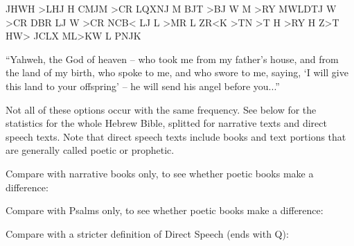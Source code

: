 \documentclass{report}
\newcommand{\cl}[2]{\begingroup\beginL\begingroup\color{#1}\beginR#2\endR\endgroup\endL\endgroup}
\begin{document}
\begin{itemize}
\begin{cjhebrew}
\cl{red}{JHWH >LHJ H CMJM >CR LQXNJ M BJT >BJ W M >RY MWLDTJ W >CR DBR LJ W >CR NCB< LJ L >MR L ZR<K >TN >T H >RY H Z>T} \\
HW> JCLX ML>KW L PNJK
\end{cjhebrew}

``Yahweh, the God of heaven -- who took me from my father’s house, and from the land of my birth, who spoke to me, and who swore to me, saying, `I will give this land to your offspring' -- he will send his angel before you...''
\end{itemize}

Not all of these options occur with the same frequency. See below for the statistics for the whole Hebrew Bible, splitted for narrative texts and direct speech texts. Note that direct speech texts include books and text portions that are generally called poetic or prophetic.\\

\noindent
\begin{minipage}{.5\textwidth}

\end{minipage}
\begin{minipage}{.5\textwidth}
\centering

\end{minipage}

Compare with narrative books only, to see whether poetic books make a difference:\\
\noindent
\begin{minipage}{.5\textwidth}

\end{minipage}
\begin{minipage}{.5\textwidth}
\centering

\end{minipage}

Compare with Psalms only, to see whether poetic books make a difference:\\
\noindent
\begin{minipage}{.5\textwidth}

\end{minipage}
\begin{minipage}{.5\textwidth}
\centering

\end{minipage}

Compare with a stricter definition of Direct Speech (ends with Q):\\
\noindent
\begin{minipage}{.5\textwidth}

\end{minipage}
\begin{minipage}{.5\textwidth}
\centering

\end{minipage}
\begin{minipage}{.5\textwidth}
\centering

\end{minipage}
\end{document}

